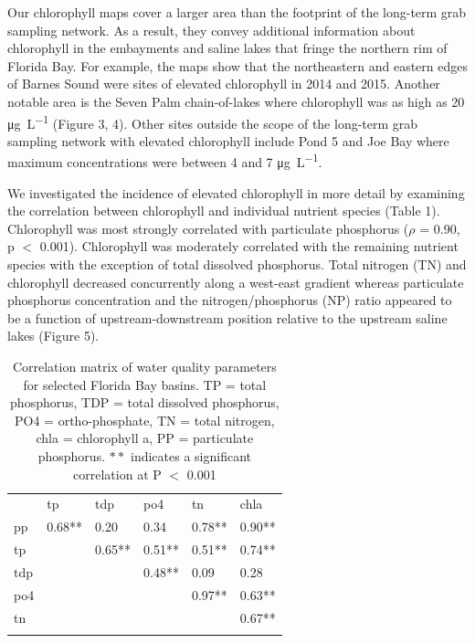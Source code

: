 Our chlorophyll maps cover a larger area than the footprint of the long-term grab sampling network. As a result, they convey additional information about chlorophyll in the embayments and saline lakes that fringe the northern rim of Florida Bay. For example, the maps show that the northeastern and eastern edges of Barnes Sound were sites of elevated chlorophyll in 2014 and 2015. Another notable area is the Seven Palm chain-of-lakes where chlorophyll was as high as 20 \si{\micro\gram\per\liter} (Figure 3, 4). Other sites outside the scope of the long-term grab sampling network with elevated chlorophyll include Pond 5 and Joe Bay where maximum concentrations were between 4 and 7 \si{\micro\gram\per\liter}. 

We investigated the incidence of elevated chlorophyll in more detail by examining the correlation between chlorophyll and individual nutrient species (Table 1). Chlorophyll was most strongly correlated with particulate phosphorus ($\rho$ = 0.90, p $<$ 0.001). Chlorophyll was moderately correlated with the remaining nutrient species with the exception of total dissolved phosphorus. Total nitrogen (TN) and chlorophyll decreased concurrently along a west-east gradient whereas particulate phosphorus concentration and the nitrogen/phosphorus (NP) ratio appeared to be a function of upstream-downstream position relative to the upstream saline lakes (Figure 5).  

\begin{table}
\centering
\caption{Correlation matrix of water quality parameters for selected Florida Bay basins. TP = total phosphorus, TDP = total dissolved phosphorus, PO4 = ortho-phosphate, TN = total nitrogen, chla = chlorophyll a, PP = particulate phosphorus. $**$ indicates a significant correlation at P $<$ 0.001}
\label{tab:1}       %
\begin{tabular}{llllll}
\hline\noalign{\smallskip}
& tp & tdp & po4 & tn & chla \\
\noalign{\smallskip}\hline\noalign{\smallskip}
pp & 0.68** & 0.20 & 0.34 & 0.78** & 0.90** \\ 
tp  &  & 0.65** & 0.51** & 0.51** & 0.74** \\ 
tdp  &  &  & 0.48** & 0.09 & 0.28 \\ 
po4  &  &  &  & 0.97** & 0.63** \\ 
tn  &  &  &  &  & 0.67** \\ 
\noalign{\smallskip}\hline
\end{tabular}
\end{table}

